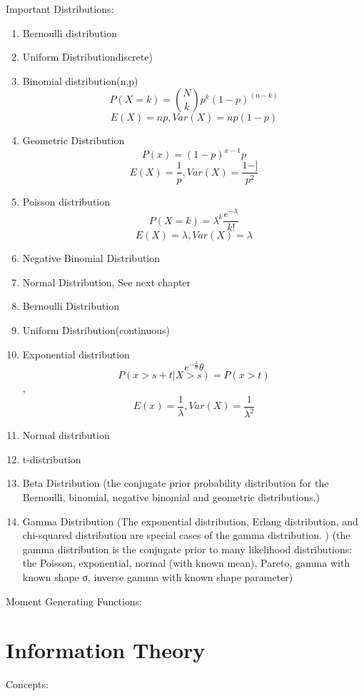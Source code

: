 \documentclass[11pt, openany]{book}              %
\begin{document}
Important Distributions: 

\begin{enumerate}
	\item Bernoulli distribution
	\item Uniform Distributiondiscrete)
	\item Binomial distribution(n,p)$$P(X=k) = {N\choose k} p^k (1-p)^{(n-k)}$$ $$E(X) =np, Var(X) =np(1-p)$$
	\item Geometric Distribution $$P(x) = (1-p)^{x-1}p$$
	$$E(X) = \frac{1}{p}, Var(X) =\frac{1-]}{p^2}$$
	\item Poisson distribution $$P(X=k) = \lambda^k \frac{e^{-\lambda}}{k!}$$ $$E(X) = \lambda, Var(X) = \lambda$$
	\item Negative Binomial Distribution
	\item Normal Distribution, See next chapter
	\item Bernoulli Distribution 
	\item Uniform Distribution(continuous)
	\item Exponential distribution $$e^{-\frac{x}{\theta}}\theta$$ $$P(x>s+t|X>s) = P(x>t)$$, $$E(x) = \frac{1}{\lambda}, Var(X) = \frac{1}{\lambda^2}$$
	\item Normal distribution
	\item t-distribution
	\item Beta Distribution (the conjugate prior probability distribution for the Bernoulli, binomial, negative binomial and geometric distributions.)
	\item Gamma Distribution 
		\subitem (The exponential distribution, Erlang distribution, and chi-squared distribution are special cases of the gamma distribution. ) 
		\subitem (the gamma distribution is the conjugate prior to many likelihood distributions: the Poisson, exponential, normal (with known mean), Pareto, gamma with known shape σ, inverse gamma with known shape parameter)
\end{enumerate} 

Moment Generating Functions:

\section{Information Theory}

Concepts:
\end{document}
